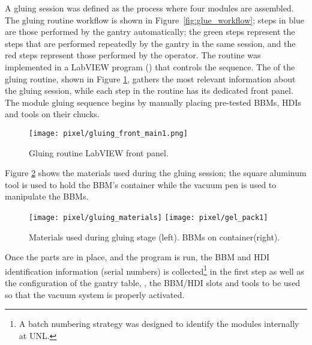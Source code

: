A gluing session was defined as the process where four modules are assembled. The gluing routine workflow is shown in Figure~\ref{fig:glue_workflow}; steps in blue are those performed by the gantry automatically; the green steps represent the steps that are performed repeatedly by the gantry in the same session, and the red steps represent those performed by the operator. The routine was implemented in a LabVIEW program () that controls the sequence. The  of the gluing routine, shown in Figure \ref{fig:gluing_front_main}, gathers the most relevant information about the gluing session, while each step in the routine has its dedicated front panel. The module gluing sequence begins by manually placing pre-tested BBMs, HDIs and tools on their chucks.

\begin{landscape}
\begin{figure}[h]
  \centering
    \vspace{-2cm}
    \hspace{-1cm}
    \texttt{[image: pixel/gluing\_front\_main1.png]}
    \caption[Gluing routine LabVIEW front panel]{Gluing routine LabVIEW front panel.}\label{fig:gluing_front_main}
    \vspace{-1cm}
    \hspace{-2cm}
\end{figure}
\end{landscape}

Figure \ref{fig:gluing_materials} shows the materials used during the gluing session; the square aluminum tool is used to hold the BBM's container while the vacuum pen is used to manipulate the BBMs.

\begin{figure}[h]
\centering
  \texttt{[image: pixel/gluing\_materials]}
  \texttt{[image: pixel/gel\_pack1]}
 \caption[Materials used during gluing stage]{Materials used during gluing stage (left). BBMs on container(right).}\label{fig:gluing_materials}
\end{figure}

Once the parts are in place, and the program is run, the BBM and HDI identification information (serial numbers) is collected\footnote{A batch numbering strategy was designed to identify the modules internally at UNL.} in the first step as well as the configuration of the gantry table, \ie, the BBM/HDI slots and tools to be used so that the vacuum system is properly activated. 

